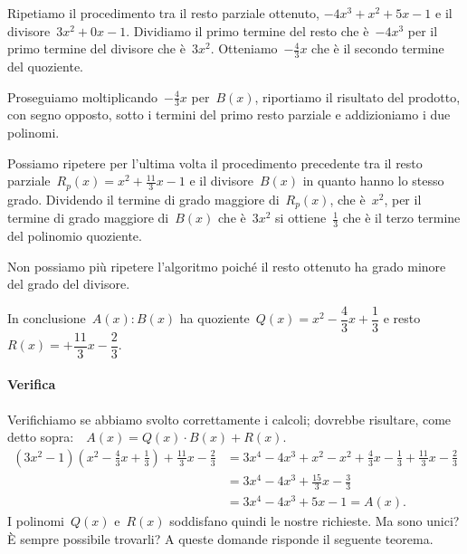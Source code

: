 \begin{esempio}
\begin{enumerate*}
\begin{center}
%  
\divpold
\end{center}
 \item 
 Ripetiamo il procedimento tra il resto parziale ottenuto, 
 \(-4x^{3}+x^{2}+5x-1\) e il divisore~\(3x^{2}+0x-1\). Dividiamo il primo termine 
 del resto che
 è~\(-4x^{3}\) per il primo termine del divisore che è~\(3x^{2}\). 
 Otteniamo~\(-{\frac{4}{3}}x\) che è il secondo termine del quoziente.

\begin{center}
%  
 \divpole
\end{center}
 \item 
 Proseguiamo moltiplicando~\(-{\frac{4}{3}}x\) per~\(B(x)\), riportiamo il 
 risultato del prodotto, con segno opposto, sotto i
 termini del primo resto parziale e addizioniamo i due polinomi.
\begin{center}
% 
\divpolf
\end{center}
 \item 
 Possiamo ripetere per l'ultima volta il procedimento precedente tra il 
 resto parziale~\(R_{p}(x)=x^{2}+\frac{11}{3}x-1\) e
 il divisore~\(B(x)\) in quanto hanno lo stesso grado. Dividendo il termine di 
 grado maggiore di~\(R_{p}(x)\), che è~\(x^{2}\),
 per il termine di grado maggiore di~\(B(x)\) che è~\(3x^{2}\) si 
 ottiene~\(\frac{1}{3}\) che è il terzo termine del polinomio quoziente.
\begin{center}
% 
\divpolg
\end{center}
\end{enumerate*}

Non possiamo più ripetere l'algoritmo poiché il resto ottenuto ha grado minore 
del grado del divisore.

In conclusione~\(A(x):B(x)\) ha 
quoziente~\(Q(x)=x^{2}-\dfrac{4}{3}x+\dfrac{1}{3}\) e 
resto~\(R(x)=+{\dfrac{11}{3}}x-\dfrac{2}{3}\).

\paragraph{Verifica}
Verifichiamo se abbiamo svolto correttamente i calcoli; dovrebbe risultare, 
come detto sopra:\(\quad A(x)=Q(x)\cdot B(x)+R(x)\).
\begin{equation*}
\begin{split}
\left(3x^{2}-1\right)\left(x^{2}-\frac{4}{3}x+\frac{1}{3}\right)+
\frac{11}{3}x-\frac{2}{3} & 
   = 3x^{4}-4x^{3}+x^{2}-x^{2}+\frac{4}{3}x-\frac{1}{3}+
     \frac{11}{3}x-\frac{2}{3}\\
  &= 3x^{4}-4x^{3}+\frac{15}{3}x-\frac{3}{3}\\
  &= 3x^{4}-4x^{3}+5x-1 = A(x).
\end{split}
\end{equation*}
I polinomi~\(Q(x)\) e~\(R(x)\) soddisfano quindi le nostre richieste. 
Ma sono unici? È sempre possibile trovarli? 
A queste domande risponde il seguente teorema.
 \end{esempio}

